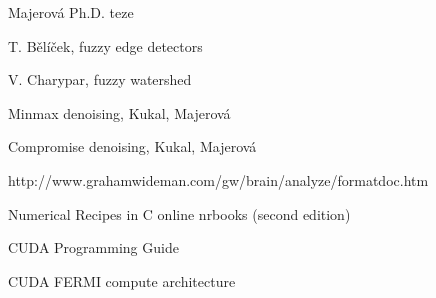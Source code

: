 \begin{thebibliography}{9}
        Majerová Ph.D. teze

        T. Bělíček, fuzzy edge detectors

        V. Charypar, fuzzy watershed

        Minmax denoising, Kukal, Majerová

        Compromise denoising, Kukal, Majerová

        http://www.grahamwideman.com/gw/brain/analyze/formatdoc.htm

        Numerical Recipes in C online nrbooks (second edition)

        CUDA Programming Guide
        
        CUDA FERMI compute architecture

\end{thebibliography} 